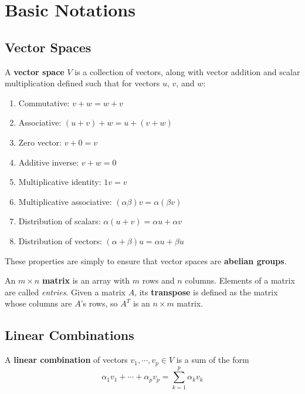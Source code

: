 \chapter{Basic Notations}
\section{Vector Spaces}
\begin{definition}
A \textbf{vector space} $V$ is a collection of vectors, along with vector addition and scalar multiplication defined such that for vectors $u$, $v$, and $w$: 

\begin{enumerate}
	\item Commutative: $v + w = w + v$
	\item Associative: $(u + v) + w = u + (v + w)$
	\item Zero vector: $ v + 0 = v$
	\item Additive inverse: $ v + w = 0$
	\item Multiplicative identity: $ 1v = v$
	\item Multiplicative associative: $ (\alpha \beta)v = \alpha(\beta v)$
	\item Distribution of scalars: $ \alpha(u + v) = \alpha u + \alpha v$
	\item Distribution of vectors: $ (\alpha + \beta)u = \alpha u + \beta u$
\end{enumerate}
\end{definition}

These properties are simply to ensure that vector spaces are \textbf{abelian groups}.

\begin{definition}
An $m \times n$ \textbf{matrix} is an array with $m$ rows and $n$ columns. Elements of a matrix are called \textit{entries}. Given a matrix $A$, its \textbf{transpose} is defined as the matrix whose columns are $A$'s rows, so $A^{T}$ is an $n \times m$ matrix. 
\end{definition}

\section{Linear Combinations}
\begin{definition}
A \textbf{linear combination} of vectors $v_{1}, \cdots, v_{p} \in V$ is a sum of the form 
$$\alpha_{1} v_{1} + \cdots + \alpha_{p} v_{p} = \sum_{k = 1}^{p} \alpha_{k} v_{k}$$
\end{definition}

